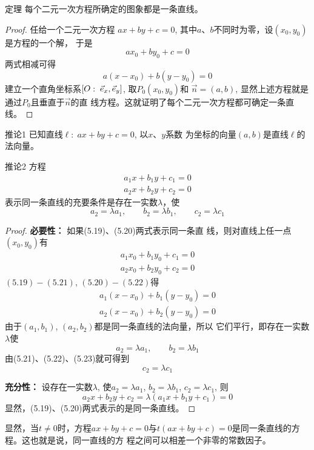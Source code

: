\begin{blk}
    {定理} 每个二元一次方程所确定的图象都是一条直线。
\end{blk}

\begin{proof}
任给一个二元一次方程
$ax+by+c=0$, 
其中$a$、$b$不同时为零，设$(x_0,y_0)$是方程的一个解，
于是
\[ax_0+by_0+c=0\]
两式相减可得
\[a(x-x_0)+b(y-y_0)=0\]
建立一个直角坐标系$[O:\; \vec{e}_x,\vec{e}_y]$, 取$P_0(x_0,y_0)$和
$\vec{n}=(a,b)$, 显然上述方程就是通过$P_0$且垂直于$\vec{n}$的直
线方程。这就证明了每个二元一次方程都可确定一条直线。
\end{proof}

\begin{blk}{推论1}
    已知直线$\ell:\; ax+by+c=0$, 以$x$、$y$系数
为坐标的向量$(a,b)$是直线$\ell$的法向量。
\end{blk}


\begin{blk}{推论2}
    方程
\begin{align}
    a_1x+b_1y+c_1=0\\
a_2x+b_2y+c_2=0
\end{align}
表示同一条直线的充要条件是存在一实数$\lambda$，使
\[a_2=\lambda a_1,\qquad b_2=\lambda b_1,\qquad  c_2=\lambda c_1\]
\end{blk}

\begin{proof}
\textbf{必要性：} 如果(5.19)、(5.20)两式表示同一条直
线，则对直线上任一点$(x_0,y_0)$有
\begin{align}
a_1x_0+b_1y_0+c_1=0\\
a_2x_0+b_2y_0+c_2=0
\end{align}
$(5.19)-(5.21)$, $(5.20)-(5.22)$得
\[\begin{split}
    a_1(x-x_0)+b_1(y-y_0)=0\\
a_2(x-x_0)+b_2(y-y_0)=0
\end{split}\]
由于$(a_1,b_1)$, $(a_2,b_2)$都是同一条直线的法向量，所以
它们平行，即存在一实数$\lambda$使
\begin{equation}
    a_2=\lambda a_1,\qquad b_2=\lambda b_1
\end{equation}
由(5.21)、(5.22)、(5.23)就可得到
\[c_2=\lambda c_1\]

\textbf{充分性：} 设存在一实数$\lambda$, 使$a_2=\lambda a_1$, $b_2=\lambda b_1$, 
$c_2=\lambda c_1$, 则
\[a_2x+b_2y+c_2=\lambda (a_1x+b_1y+c_1)=0\]
显然，(5.19)、(5.20)两式表示的是同一条直线。
\end{proof}

显然，当$t\ne 0$时，方程$ax+by+c=0$与$t(ax+by
+c)=0$是同一条直线的方程。这也就是说，同一直线的方
程之间可以相差一个非零的常数因子。

